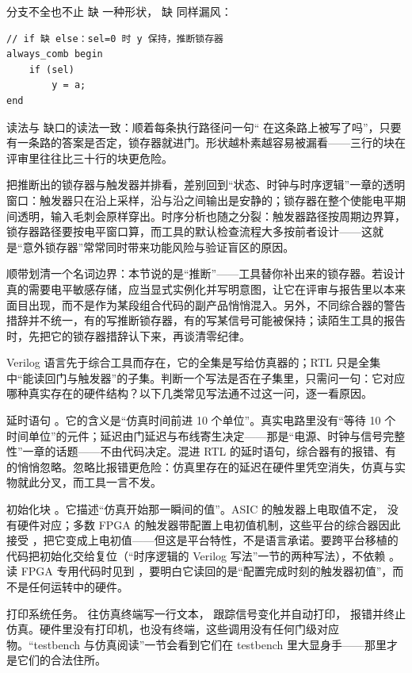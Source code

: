 分支不全也不止  缺  一种形状， 缺  同样漏风：

\begin{lstlisting}
// if 缺 else：sel=0 时 y 保持，推断锁存器
always_comb begin
    if (sel)
        y = a;
end
\end{lstlisting}

读法与  缺口的读法一致：顺着每条执行路径问一句“ 在这条路上被写了吗”，只要有一条路的答案是否定，锁存器就进门。形状越朴素越容易被漏看——三行的块在评审里往往比三十行的块更危险。

把推断出的锁存器与触发器并排看，差别回到“状态、时钟与时序逻辑”一章的透明窗口：触发器只在沿上采样，沿与沿之间输出是安静的；锁存器在整个使能电平期间透明，输入毛刺会原样穿出。时序分析也随之分裂：触发器路径按周期边界算，锁存器路径要按电平窗口算，而工具的默认检查流程大多按前者设计——这就是“意外锁存器”常常同时带来功能风险与验证盲区的原因。

顺带划清一个名词边界：本节说的是“推断”——工具替你补出来的锁存器。若设计真的需要电平敏感存储，应当显式实例化并写明意图，让它在评审与报告里以本来面目出现，而不是作为某段组合代码的副产品悄悄混入。另外，不同综合器的警告措辞并不统一，有的写推断锁存器，有的写某信号可能被保持；读陌生工具的报告时，先把它的锁存器措辞认下来，再谈清零纪律。


Verilog 语言先于综合工具而存在，它的全集是写给仿真器的；RTL 只是全集中“能读回门与触发器”的子集。判断一个写法是否在子集里，只需问一句：它对应哪种真实存在的硬件结构？以下几类常见写法通不过这一问，逐一看原因。

延时语句 。它的含义是“仿真时间前进 10 个单位”。真实电路里没有“等待 10 个时间单位”的元件；延迟由门延迟与布线寄生决定——那是“电源、时钟与信号完整性”一章的话题——不由代码决定。混进 RTL 的延时语句，综合器有的报错、有的悄悄忽略。忽略比报错更危险：仿真里存在的延迟在硬件里凭空消失，仿真与实物就此分叉，而工具一言不发。

初始化块 。它描述“仿真开始那一瞬间的值”。ASIC 的触发器上电取值不定， 没有硬件对应；多数 FPGA 的触发器带配置上电初值机制，这些平台的综合器因此接受 ，把它变成上电初值——但这是平台特性，不是语言承诺。要跨平台移植的代码把初始化交给复位（“时序逻辑的 Verilog 写法”一节的两种写法），不依赖 。读 FPGA 专用代码时见到 ，要明白它读回的是“配置完成时刻的触发器初值”，而不是任何运转中的硬件。

打印系统任务。 往仿真终端写一行文本， 跟踪信号变化并自动打印， 报错并终止仿真。硬件里没有打印机，也没有终端，这些调用没有任何门级对应物。“testbench 与仿真阅读”一节会看到它们在 testbench 里大显身手——那里才是它们的合法住所。

